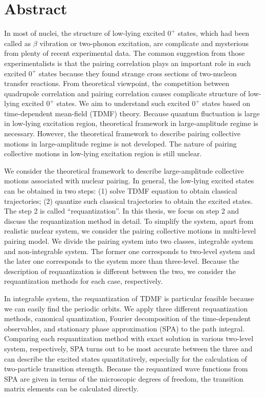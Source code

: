 \documentclass[11pt]{book} %
\begin{document}
\chapter*{Abstract}
\thispagestyle{empty}

In most of nuclei, the structure of low-lying excited $0^+$ states, which had been called as $\beta$ vibration or two-phonon excitation, are complicate and mysterious from plenty of recent experimental data. The common suggestion from those experimentalists is that the pairing correlation plays an important role in such excited $0^+$ states because they found strange cross sections of two-nucleon transfer reactions. From theoretical viewpoint, 
the competition between quadrupole correlation and pairing correlation causes complicate structure of low-lying excited $0^+$ states. 
We aim to understand such excited $0^+$ states based on time-dependent mean-field (TDMF) theory. Because quantum fluctuation is large in low-lying excitation region, theoretical framework in large-amplitude regime is necessary. However, the theoretical framework to describe pairing collective motions in large-amplitude regime is not developed. The nature of pairing collective motions in low-lying excitation region is still unclear.

We consider the theoretical framework to describe large-amplitude collective motions associated with nuclear pairing. In general, the low-lying excited states can be obtained in two steps: (1) solve TDMF equation to obtain classical trajectories; (2) quantize such classical trajectories to obtain the excited states. The step 2 is called ``requantization''. In this thesis, we focus on step 2 and discuss the requantization method in detail. To simplify the system, apart from realistic nuclear system, we consider the pairing collective motions in multi-level pairing model. We divide the pairing system into two classes, integrable system and non-integrable system. The former one corresponds to two-level system and the later one corresponds to the system more than three-level. Because the description of requantization is different between the two, we consider the requantization methods for each case, respectively.

In integrable system, the requantization of TDMF is particular feasible because we can easily find the periodic orbits. We apply three different requantization methods, canonical quantization, Fourier decomposition of the time-dependent observables, and stationary phase approximation (SPA) to the path integral. Comparing each requantization method with exact solution in various two-level system, respectively, SPA turns out to be most accurate between the three and can describe the excited states quantitatively, especially for the calculation of two-particle transition strength. Because the requantized wave functions from SPA are given in terms of the microscopic degrees of freedom, the transition matrix elements can be calculated directly.
\end{document}
